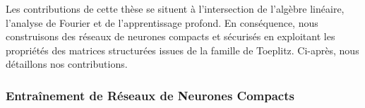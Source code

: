 
Les contributions de cette thèse se situent à l'intersection de l'algèbre linéaire, l'analyse de Fourier et de l'apprentissage profond.
En conséquence, nous construisons des réseaux de neurones compacts et sécurisés en exploitant les propriétés des matrices structurées issues de la famille de Toeplitz.
Ci-après, nous détaillons nos contributions.



\subsubsection{Entraînement de Réseaux de Neurones Compacts}
\label{subsubsection:ap7-training_compact_neural_networks}

%


